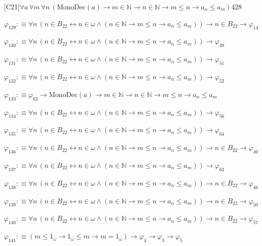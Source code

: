 \begin{fullproof}{[C21]}{$\forall a\,\forall m\,\forall n\,(\mathrm{MonoDec}(a) \to m \in \mathbb{N} \to n \in \mathbb{N} \to m \leq n \to a_{n} \leq a_{m})$}{428}
\begin{abbrevlist}
\item $\varphi_{129} :\equiv \forall n\,(n \in B_{22} \leftrightarrow n \in \omega \land (n \in \mathbb{N} \to m \leq n \to a_{n} \leq a_{m})) \to n \in B_{22} \to \varphi_{14}$
\item $\varphi_{130} :\equiv \forall n\,(n \in B_{22} \leftrightarrow n \in \omega \land (n \in \mathbb{N} \to m \leq n \to a_{n} \leq a_{m})) \to \varphi_{49}$
\item $\varphi_{131} :\equiv \forall n\,(n \in B_{22} \leftrightarrow n \in \omega \land (n \in \mathbb{N} \to m \leq n \to a_{n} \leq a_{m})) \to \varphi_{51}$
\item $\varphi_{132} :\equiv \forall n\,(n \in B_{22} \leftrightarrow n \in \omega \land (n \in \mathbb{N} \to m \leq n \to a_{n} \leq a_{m})) \to \varphi_{52}$
\item $\varphi_{133} :\equiv \varphi_{62} \to \mathrm{MonoDec}(a) \to m \in \mathbb{N} \to n \in \mathbb{N} \to m \leq n \to a_{n} \leq a_{m}$
\item $\varphi_{134} :\equiv \forall n\,(n \in B_{22} \leftrightarrow n \in \omega \land (n \in \mathbb{N} \to m \leq n \to a_{n} \leq a_{m})) \to \varphi_{56}$
\item $\varphi_{135} :\equiv \forall n\,(n \in B_{22} \leftrightarrow n \in \omega \land (n \in \mathbb{N} \to m \leq n \to a_{n} \leq a_{m})) \to \varphi_{64}$
\item $\varphi_{136} :\equiv \forall n\,(n \in B_{22} \leftrightarrow n \in \omega \land (n \in \mathbb{N} \to m \leq n \to a_{n} \leq a_{m})) \to n \in B_{22} \to \varphi_{40}$
\item $\varphi_{137} :\equiv \forall n\,(n \in B_{22} \leftrightarrow n \in \omega \land (n \in \mathbb{N} \to m \leq n \to a_{n} \leq a_{m})) \to \varphi_{63}$
\item $\varphi_{138} :\equiv \forall n\,(n \in B_{22} \leftrightarrow n \in \omega \land (n \in \mathbb{N} \to m \leq n \to a_{n} \leq a_{m})) \to n \in B_{22} \to \varphi_{46}$
\item $\varphi_{139} :\equiv \forall n\,(n \in B_{22} \leftrightarrow n \in \omega \land (n \in \mathbb{N} \to m \leq n \to a_{n} \leq a_{m})) \to n \in B_{22} \to \varphi_{50}$
\item $\varphi_{140} :\equiv \forall n\,(n \in B_{22} \leftrightarrow n \in \omega \land (n \in \mathbb{N} \to m \leq n \to a_{n} \leq a_{m})) \to n \in B_{22} \to \varphi_{57}$
\item $\varphi_{141} :\equiv (m \leq 1_{\omega} \to 1_{\omega} \leq m \to m = 1_{\omega}) \to \varphi_{4} \to \varphi_{3} \to \varphi_{5}$

\end{abbrevlist}
\end{fullproof}
